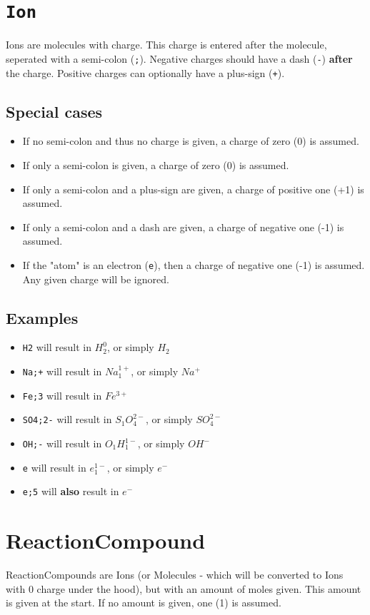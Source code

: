 \documentclass[11pt]{article}
\def\code#1{\texttt{#1}}
\begin{document}
\section{\code{Ion}}
Ions are molecules with charge. This charge is entered after the molecule, seperated with a semi-colon (\code{;}). Negative charges should have a dash (\code{-}) \textbf{after} the charge. Positive charges can optionally have a plus-sign (\code{+}).

\subsection{Special cases}
\begin{itemize}
  \item{If no semi-colon and thus no charge is given, a charge of zero (0) is assumed.}
  \item{If only a semi-colon is given, a charge of zero (0) is assumed.}
  \item{If only a semi-colon and a plus-sign are given, a charge of positive one (+1) is assumed.}
  \item{If only a semi-colon and a dash are given, a charge of negative one (-1) is assumed.}
  \item{If the "atom" is an electron (\code{e}), then a charge of negative one (-1) is assumed. Any given charge will be ignored.}
\end{itemize}

\subsection{Examples}
\begin{itemize}
  \item{\code{H2} will result in $H_2^0$, or simply $H_2$}
  \item{\code{Na;+} will result in $Na_1^{1+}$, or simply $Na^+$}
  \item{\code{Fe;3} will result in $Fe^{3+}$}
  \item{\code{SO4;2-} will result in $S_1O_4^{2-}$, or simply $SO_4^{2-}$}
  \item{\code{OH;-} will result in $O_1H_1^{1-}$, or simply $OH^{-}$}
  \item{\code{e} will result in $e_1^{1-}$, or simply $e^-$}
  \item{\code{e;5} will \textbf{also} result in $e^-$}
\end{itemize}

\section{ReactionCompound}
ReactionCompounds are Ions (or Molecules - which will be converted to Ions with 0 charge under the hood), but with an amount of moles given. This amount is given at the start. If no amount is given, one (1) is assumed.
\end{document}
